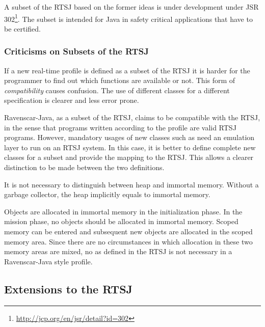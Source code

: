 A subset of the RTSJ based on the former ideas is under development
under JSR 302\footnote{\url{http://jcp.org/en/jsr/detail?id=302}}.
The subset is intended for Java in safety critical applications that
have to be certified.

\subsubsection{Criticisms on Subsets of the RTSJ}

If a new real-time profile is defined as a subset of the RTSJ it is
harder for the programmer to find out which functions are available
or not. This form of \textit{compatibility} causes confusion. The
use of different classes for a different specification is clearer
and less error prone.

Ravenscar-Java, as a subset of the RTSJ, claims to be compatible
with the RTSJ, in the sense that programs written according to the
profile are valid RTSJ programs. However, mandatory usages of new
classes such as  need an emulation layer to run
on an RTSJ system. In this case, it is better to define complete new
classes for a subset and provide the mapping to the RTSJ. This
allows a clearer distinction to be made between the two definitions.

It is not necessary to distinguish between heap and immortal memory.
Without a garbage collector, the heap implicitly equals to immortal
memory.

Objects are allocated in immortal memory in the initialization phase.
In the mission phase, no objects should be allocated in immortal
memory. Scoped memory can be entered and subsequent new objects are
allocated in the scoped memory area. Since there are no circumstances
in which allocation in these two memory areas are mixed, no
as defined in the RTSJ is not necessary in a
Ravenscar-Java style profile.

\subsection{Extensions to the RTSJ}

